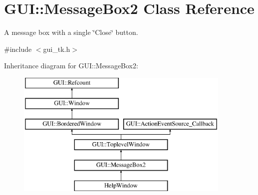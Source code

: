 \hypertarget{classGUI_1_1MessageBox2}{\section{G\-U\-I\-:\-:Message\-Box2 Class Reference}
\label{classGUI_1_1MessageBox2}
}


A message box with a single \char`\"{}\-Close\char`\"{} button.  




{\ttfamily \#include $<$gui\-\_\-tk.\-h$>$}

Inheritance diagram for G\-U\-I\-:\-:Message\-Box2\-:\begin{figure}[H]
\begin{center}
\leavevmode
\includegraphics[height=6.000000cm]{classGUI_1_1MessageBox2}
\end{center}
\end{figure}
